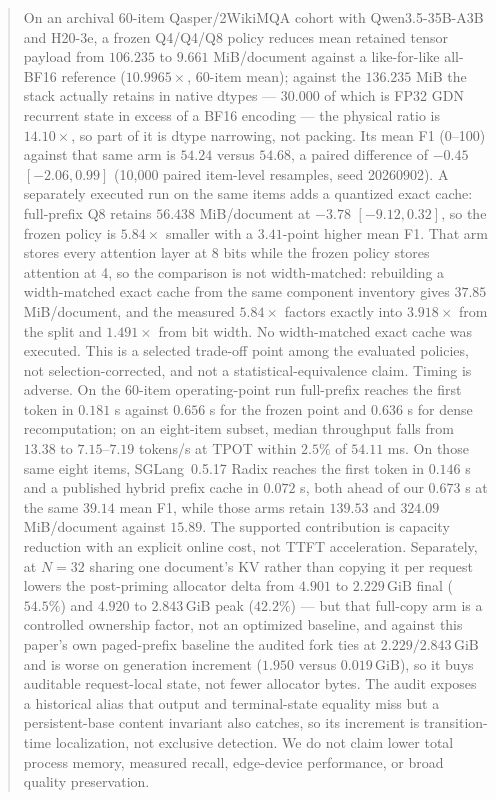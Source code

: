 \documentclass{article}
\newcommand{\gib}{\,\mathrm{GiB}}
\begin{document}
\begin{abstract}
On an archival 60-item Qasper/2WikiMQA cohort with Qwen3.5-35B-A3B and H20-3e, a
frozen Q4/Q4/Q8 policy reduces mean retained tensor payload from $106.235$ to
$9.661$ MiB/document against a like-for-like all-BF16 reference
($10.9965\times$, 60-item mean); against the $136.235$ MiB the stack actually
retains in native dtypes --- $30.000$ of which is FP32 GDN recurrent state in
excess of a BF16 encoding --- the physical ratio is $14.10\times$, so part of it
is dtype narrowing, not packing.  Its mean F1 (0--100) against that same arm is
$54.24$ versus $54.68$, a paired difference of $-0.45$ $[-2.06,0.99]$ (10,000
paired item-level resamples, seed 20260902).  A separately executed run on the
same items adds a quantized exact cache: full-prefix Q8 retains $56.438$
MiB/document at $-3.78$ $[-9.12,0.32]$, so the frozen policy is $5.84\times$
smaller with a $3.41$-point higher mean F1.  That arm stores every attention
layer at 8 bits while the frozen policy stores attention at 4, so the comparison
is not width-matched: rebuilding a width-matched exact cache from the same
component inventory gives $37.85$ MiB/document, and the measured $5.84\times$
factors exactly into $3.918\times$ from the split and $1.491\times$ from bit
width.  No width-matched exact cache was executed.  This is a selected
trade-off point among the evaluated policies, not selection-corrected, and not a
statistical-equivalence claim.  Timing is adverse.  On the 60-item
operating-point run full-prefix reaches the first token in $0.181$ s against
$0.656$ s for the frozen point and $0.636$ s for dense recomputation; on an
eight-item subset, median throughput falls from $13.38$ to $7.15$--$7.19$
tokens/s at TPOT within $2.5\%$ of $54.11$ ms.  On those same eight items,
SGLang~0.5.17 Radix reaches the first token in $0.146$ s and a published hybrid
prefix cache in $0.072$ s, both ahead of our $0.673$ s at the same $39.14$ mean
F1, while those arms retain $139.53$ and $324.09$ MiB/document against $15.89$.
The supported contribution is capacity reduction with an explicit online cost,
not TTFT acceleration.  Separately, at $N=32$
sharing one document's KV rather than copying it per request lowers the
post-priming allocator delta from $4.901$ to $2.229\gib$ final ($54.5\%$) and
$4.920$ to $2.843\gib$ peak ($42.2\%$) --- but that full-copy arm is a
controlled ownership factor, not an optimized baseline, and against this paper's
own paged-prefix baseline the audited fork ties at $2.229/2.843\gib$ and is
worse on generation increment ($1.950$ versus $0.019\gib$), so it buys auditable
request-local state, not fewer allocator bytes.  The audit exposes a historical
alias that output and terminal-state equality miss but a persistent-base content
invariant also catches, so its increment is transition-time localization, not
exclusive detection.  We do not claim lower total process memory, measured
recall, edge-device performance, or broad quality preservation.
\end{abstract}
\end{document}
